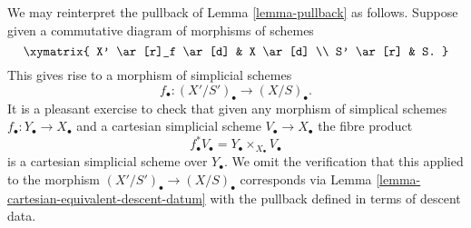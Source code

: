 \noindent
We may reinterpret the pullback of Lemma \ref{lemma-pullback} as follows.
Suppose given a commutative diagram of morphisms of schemes
$$
\xymatrix{
X' \ar[r]_f \ar[d] & X \ar[d] \\
S' \ar[r] & S.
}
$$
This gives rise to a morphism of simplicial schemes
$$
f_\bullet : (X'/S')_\bullet \longrightarrow (X/S)_\bullet.
$$
It is a pleasant exercise to check that given any morphism
of simplical schemes $f_\bullet : Y_\bullet \to X_\bullet$ and a
cartesian simplicial scheme $V_\bullet \to X_\bullet$
the fibre product
$$
f_\bullet^*V_\bullet = Y_\bullet \times_{X_\bullet} V_\bullet
$$
is a cartesian simplicial scheme over $Y_\bullet$. We omit
the verification that this applied to the morphism
$(X'/S')_\bullet \to (X/S)_\bullet$ corresponds via
Lemma \ref{lemma-cartesian-equivalent-descent-datum}
with the pullback defined in terms of descent data.















